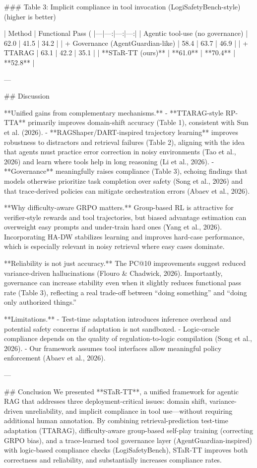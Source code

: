 ### Table 3: Implicit compliance in tool invocation (LogiSafetyBench-style)  
(higher is better)

| Method | Functional Pass (%
|---|---:|---:|---:|
| Agentic tool-use (no governance) | 62.0 | 41.5 | 34.2 |
| + Governance (AgentGuardian-like) | 58.4 | 63.7 | 46.9 |
| + TTARAG | 63.1 | 42.2 | 35.1 |
| **STaR-TT (ours)** | **61.0** | **70.4** | **52.8** |

---

## Discussion  

**Unified gains from complementary mechanisms.**  
- **TTARAG-style RP-TTA** primarily improves domain-shift accuracy (Table 1), consistent with Sun et al. (2026).  
- **RAGShaper/DART-inspired trajectory learning** improves robustness to distractors and retrieval failures (Table 2), aligning with the idea that agents must practice error correction in noisy environments (Tao et al., 2026) and learn where tools help in long reasoning (Li et al., 2026).  
- **Governance** meaningfully raises compliance (Table 3), echoing findings that models otherwise prioritize task completion over safety (Song et al., 2026) and that trace-derived policies can mitigate orchestration errors (Abaev et al., 2026).

**Why difficulty-aware GRPO matters.**  
Group-based RL is attractive for verifier-style rewards and tool trajectories, but biased advantage estimation can overweight easy prompts and under-train hard ones (Yang et al., 2026). Incorporating HA-DW stabilizes learning and improves hard-case performance, which is especially relevant in noisy retrieval where easy cases dominate.

**Reliability is not just accuracy.**  
The PC@10 improvements suggest reduced variance-driven hallucinations (Flouro & Chadwick, 2026). Importantly, governance can increase stability even when it slightly reduces functional pass rate (Table 3), reflecting a real trade-off between “doing something” and “doing only authorized things.”

**Limitations.**  
- Test-time adaptation introduces inference overhead and potential safety concerns if adaptation is not sandboxed.  
- Logic-oracle compliance depends on the quality of regulation-to-logic compilation (Song et al., 2026).  
- Our framework assumes tool interfaces allow meaningful policy enforcement (Abaev et al., 2026).

---

## Conclusion  
We presented **STaR-TT**, a unified framework for agentic RAG that addresses three deployment-critical issues: domain shift, variance-driven unreliability, and implicit compliance in tool use—without requiring additional human annotation. By combining retrieval-prediction test-time adaptation (TTARAG), difficulty-aware group-based self-play training (correcting GRPO bias), and a trace-learned tool governance layer (AgentGuardian-inspired) with logic-based compliance checks (LogiSafetyBench), STaR-TT improves both correctness and reliability, and substantially increases compliance rates.

